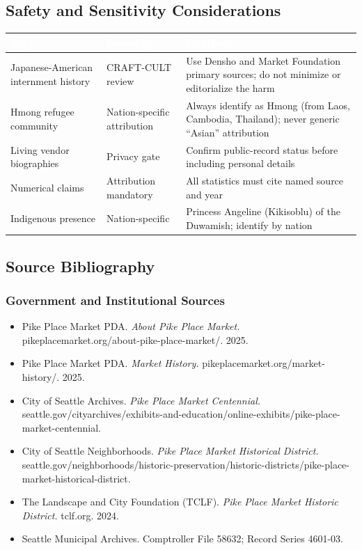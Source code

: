 \documentclass[11pt,letterpaper]{article}
\newcommand{\tableheader}[1]{\textbf{\sffamily\textcolor{white}{#1}}}
\begin{document}
\subsection{Safety and Sensitivity Considerations}

\begin{center}
\begin{tabularx}{\textwidth}{L{3.5cm}L{2.5cm}X}
\toprule
{}
\tableheader{Topic} & \tableheader{Boundary} & \tableheader{Guidance} \\
\midrule
Japanese-American internment history & CRAFT-CULT review & Use Densho and Market Foundation primary sources; do not minimize or editorialize the harm \\
Hmong refugee community & Nation-specific attribution & Always identify as Hmong (from Laos, Cambodia, Thailand); never generic ``Asian'' attribution \\
Living vendor biographies & Privacy gate & Confirm public-record status before including personal details \\
Numerical claims & Attribution mandatory & All statistics must cite named source and year \\
Indigenous presence & Nation-specific & Princess Angeline (Kikisoblu) of the Duwamish; identify by nation \\
\bottomrule
\end{tabularx}
\end{center}

\subsection{Source Bibliography}

\subsubsection{Government and Institutional Sources}
\begin{itemize}[noitemsep]
  \item Pike Place Market PDA. \textit{About Pike Place Market.} pikeplacemarket.org/about-pike-place-market/. 2025.
  \item Pike Place Market PDA. \textit{Market History.} pikeplacemarket.org/market-history/. 2025.
  \item City of Seattle Archives. \textit{Pike Place Market Centennial.} seattle.gov/cityarchives/exhibits-and-education/online-exhibits/pike-place-market-centennial.
  \item City of Seattle Neighborhoods. \textit{Pike Place Market Historical District.} seattle.gov/neighborhoods/historic-preservation/historic-districts/pike-place-market-historical-district.
  \item The Landscape and City Foundation (TCLF). \textit{Pike Place Market Historic District.} tclf.org. 2024.
  \item Seattle Municipal Archives. Comptroller File 58632; Record Series 4601-03.
\end{itemize}
\end{document}
